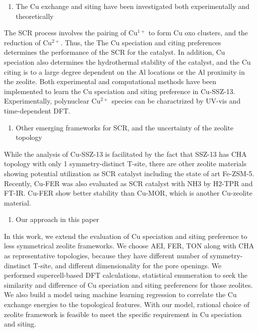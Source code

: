 \documentclass[12pt]{article}
\begin{document}
\begin{enumerate}[resume]
\item The Cu exchange and siting have been investigated both experimentally and theoretically
\end{enumerate}
The SCR process involves the pairing of Cu$^{1+}$ to form Cu oxo clusters, and the reduction of Cu$^{2+}$.\cite{Paolucciscience} Thus, the The Cu speciation and citing preferences determines the performance of the SCR for the catalyst. In addition, Cu speciation also determines the hydrothermal stability of the catalyst, and the Cu citing is to a large degree dependent on the Al locations or the Al proximity in the zeolite.\cite{Paolucci2016, Li2018JPCC} Both experimental and computational methods have been implemented to learn the Cu speciation and siting preference in Cu-SSZ-13. Experimentally, polynuclear Cu$^{2+}$ species can be charactrized by UV-vis and time-dependent DFT.\cite{Hui-UV-vis}

\begin{enumerate}[resume]
\item Other emerging frameworks for SCR, and the uncertainty of the zeolite topology
\end{enumerate}
While the analysis of Cu-SSZ-13 is facilitated by the fact that SSZ-13 has CHA topology with only 1 symmetry-distinct T-site, there are other zeolite materials showing potential utilization as SCR catalyst including the state of art Fe-ZSM-5.\cite{doi:10.1080/01614940802480122} Recently, Cu-FER was also evaluated as SCR catalyst with NH3 by H2-TPR and FT-IR. \cite{tarot2018influence} Cu-FER show better stability than Cu-MOR, which is another Cu-zeolite material.\cite{sultana2011selective}

\begin{enumerate}[resume]
\item Our approach in this paper
\end{enumerate}
In this work, we extend the evaluation of Cu speciation and siting preference to less symmetrical zeolite frameworks. We choose AEI, FER, TON along with CHA as representative topologies, because they have different number of symmetry-dinstinct T-site, and different dimensionality for the pore openings. We performed supercell-based DFT calculations, statistical enumeration to seek the similarity and difference of Cu speciation and siting preferences for those zeolites. We also build a model using machine learning regression to correlate the Cu exchange energies to the topological features. With our model, rational choice of zeolite framework is feasible to meet the specific requirement in Cu speciation and siting.
\end{document}
